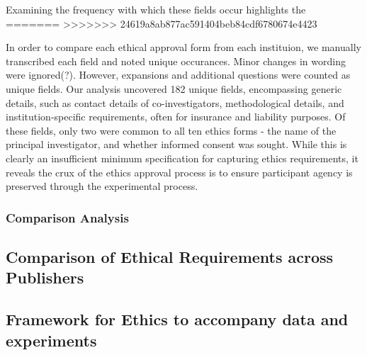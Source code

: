Examining the frequency with which these fields occur highlights the 
=======
>>>>>>> 24619a8ab877ac591404beb84cdf6780674e4423




In order to compare each ethical approval form from each instituion, we manually transcribed each field and noted unique occurances. Minor changes in wording were ignored(?). However, expansions and additional questions were counted as unique fields. Our analysis uncovered 182 unique fields, encompassing generic details, such as contact details of co-investigators, methodological details, and institution-specific requirements, often for insurance and liability purposes. Of these fields, only two were common to all ten ethics forms - the name of the principal investigator, and whether informed consent was sought. While this is clearly an insufficient  minimum specification for capturing ethics requirements, it reveals the crux of the ethics approval process is to ensure participant agency is preserved through the experimental process.

\subsubsection{Comparison Analysis}












\subsection{Comparison of Ethical Requirements across Publishers}

\subsection{Framework for Ethics to accompany data and experiments}

